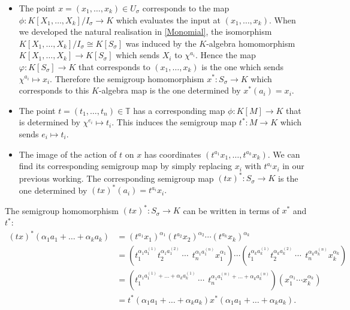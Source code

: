\documentclass[BSc]{usydthesis}
\numberwithin{equation}{chapter}
\theoremstyle{remark}
\newcommand{\T}{\mathbb{T}}
\begin{document}
\begin{itemize}
 \item The point $x=(x_1,\ldots, x_k) \in U_{\sigma}$ corresponds to the map $\phi: K[X_1,\ldots, X_k]/I_{\sigma} \to K$ which evaluates the input at $(x_1,\ldots, x_k).$ When we developed the natural realisation in \ref{Monomial}, the isomorphism $K[X_1,\ldots, X_k]/I_{\sigma} \cong K[S_{\sigma}]$ was induced by the $K$-algebra homomorphism $K[X_1,\ldots, X_k] \to K[S_{\sigma}]$ which sends $X_i$ to $\chi^{a_i}.$ Hence the map $\varphi: K[S_{\sigma}]\to K$ that corresponds to $(x_1,\ldots, x_k)$ is the one which sends $\chi^{a_i} \mapsto x_i.$ Therefore the semigroup homomorphism $x^*:S_{\sigma}\to K$ which corresponds to this $K$-algebra map is the one determined by $x^*(a_i)= x_i.$
 \item The point $t=(t_1,\ldots, t_n)\in \T$ has a corresponding map $\phi: K[M] \to K$ that is determined by $\chi^{e_i} \mapsto t_i.$ This induces the semigroup map $t^*:M\to K$ which sends $e_i \mapsto t_i.$ 
 \item The image of the action of $t$ on $x$ has coordinates $(t^{a_1}x_1, \ldots, t^{a_k} x_k).$ We can find its corresponding semigroup map by simply replacing $x_i$ with $t^{a_i}x_i$ in our previous working. The corresponding semigroup map $(tx)^*:S_{\sigma}\to K$ is the one determined by $(tx)^*(a_i)= t^{a_i} x_i.$ 
\end{itemize}
The semigroup homomorphism $(tx)^*:S_{\sigma} \to K$ can be written in terms of $x^*$ and $t^*:$ 
\begin{align*}
 (tx)^*( \alpha_1 a_1 + \ldots + \alpha_k a_k) &= (t^{a_1} x_1)^{\alpha_1}(t^{a_2} x_2)^{\alpha_2} \cdots (t^{a_k} x_k)^{\alpha_k} \\
 &= \left(t_1^{\alpha_1 a_1^{(1)}} t_2^{\alpha_1 a_1^{(2)}}  \ \cdots \  \ t_n^{\alpha_1 a_1^{(n)}} x_1^{\alpha_1}\right) \cdots \left(t_1^{\alpha_k a_k^{(1)}} t_2^{\alpha_k a_k^{(2)}} \ \cdots \ \ t_n^{\alpha_k a_k^{(n)}} x_k^{\alpha_k}\right) \\
 &= \left( t_1^{\alpha_1 a_1^{(1)} + \ldots + \alpha_k a_k^{(1)}}  \ \cdots \  \ t_n^{\alpha_1 a_1^{(n)} + \ldots + \alpha_k a_k^{(n)}} \right)\left( x_1^{\alpha_1} \cdots x_k^{\alpha_k} \right) \\
 &= t^*( \alpha_1 a_1 + \ldots + \alpha_k a_k) x^*(\alpha_1 a_1 + \ldots + \alpha_k a_k).\\
\end{align*}
\end{document}
